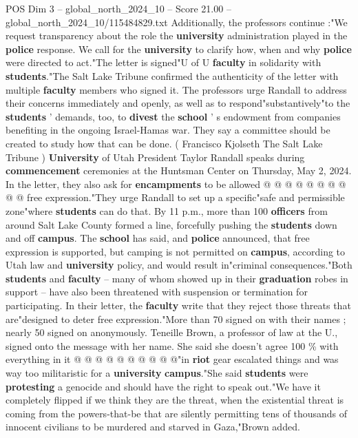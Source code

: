 \begin{textsample}{POS Dim 3 – global\_north\_2024\_10 – Score 21.00 – global\_north\_2024\_10/115484829.txt}
Additionally, the professors continue :"We request transparency about the role the \textbf{university} administration played in the \textbf{police} response.
We call for the \textbf{university} to clarify how, when and why \textbf{police} were directed to act."The letter is signed"U of U \textbf{faculty} in solidarity with \textbf{students}."The Salt Lake Tribune confirmed the authenticity of the letter with multiple \textbf{faculty} members who signed it.
The professors urge Randall to address their concerns immediately and openly, as well as to respond"substantively"to the \textbf{students} ' demands, too, to \textbf{divest} the \textbf{school} ' s endowment from companies benefiting in the ongoing Israel-Hamas war.
They say a committee should be created to study how that can be done. ( Francisco Kjolseth The Salt Lake Tribune ) \textbf{University} of Utah President Taylor Randall speaks during \textbf{commencement} ceremonies at the Huntsman Center on Thursday, May 2, 2024.
In the letter, they also ask for \textbf{encampments} to be allowed @ @ @ @ @ @ @ @ @ @ free expression."They urge Randall to set up a specific"safe and permissible zone"where \textbf{students} can do that.
By 11 p.m., more than 100 \textbf{officers} from around Salt Lake County formed a line, forcefully pushing the \textbf{students} down and off \textbf{campus}.
The \textbf{school} has said, and \textbf{police} announced, that free expression is supported, but camping is not permitted on \textbf{campus}, according to Utah law and \textbf{university} policy, and would result in"criminal consequences."Both \textbf{students} and \textbf{faculty} -- many of whom showed up in their \textbf{graduation} robes in support -- have also been threatened with suspension or termination for participating.
In their letter, the \textbf{faculty} write that they reject those threats that are"designed to deter free expression."More than 70 signed on with their names ; nearly 50 signed on anonymously.
Teneille Brown, a professor of law at the U., signed onto the message with her name.
She said she doesn't agree 100 \% with everything in it @ @ @ @ @ @ @ @ @ @"in \textbf{riot} gear escalated things and was way too militaristic for a \textbf{university} \textbf{campus}."She said \textbf{students} were \textbf{protesting} a genocide and should have the right to speak out."We have it completely flipped if we think they are the threat, when the existential threat is coming from the powers-that-be that are silently permitting tens of thousands of innocent civilians to be murdered and starved in Gaza,"Brown added.

\end{textsample}

